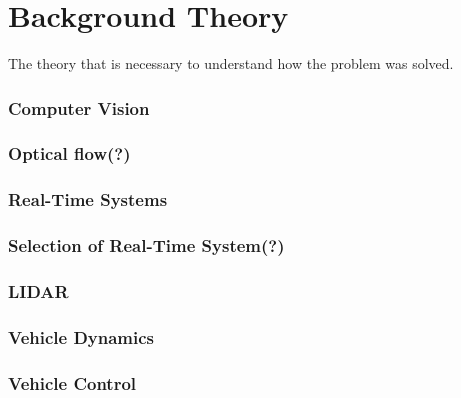 \chapter{Background Theory}

The theory that is necessary to understand how the problem was solved.

\subsection{Computer Vision}

\subsection{Optical flow(?)}

\subsection{Real-Time Systems}

\subsection{Selection of Real-Time System(?)}

\subsection{LIDAR}

\subsection{Vehicle Dynamics}

\subsection{Vehicle Control}


